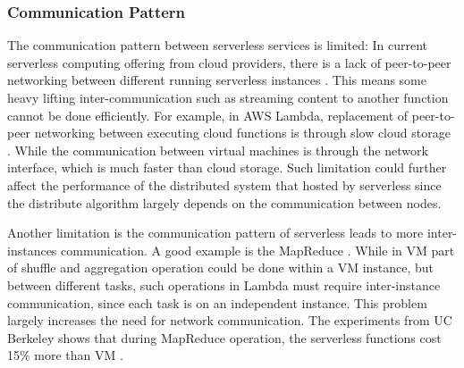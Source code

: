 \subsubsection{Communication Pattern}
The communication pattern between serverless services is limited: 
In current serverless computing offering from cloud providers, there is a lack of peer-to-peer networking between different running serverless instances \cite{hellerstein2018serverless}. This means some heavy lifting inter-communication such as streaming content to another function \cite{ServerlessNetworking} cannot be done efficiently. For example, in AWS Lambda, replacement of peer-to-peer networking between executing cloud functions is through slow cloud storage \cite{hellerstein2018serverless}. While the communication between virtual machines is through the network interface, which is much faster than cloud storage. Such limitation could further affect the performance of the distributed system that hosted by serverless since the distribute algorithm largely depends on the communication between nodes.
\par
Another limitation is the communication pattern of serverless leads to more inter-instances communication. A good example is the MapReduce \cite{jonas2019cloud}. While in VM part of shuffle and aggregation operation could be done within a VM instance, but between different tasks, such operations in Lambda must require inter-instance communication, since each task is on an independent instance. This problem largely increases the need for network communication. The experiments from UC Berkeley shows that during MapReduce operation, the serverless functions cost 15\% more than VM \cite{jonas2019cloud}.